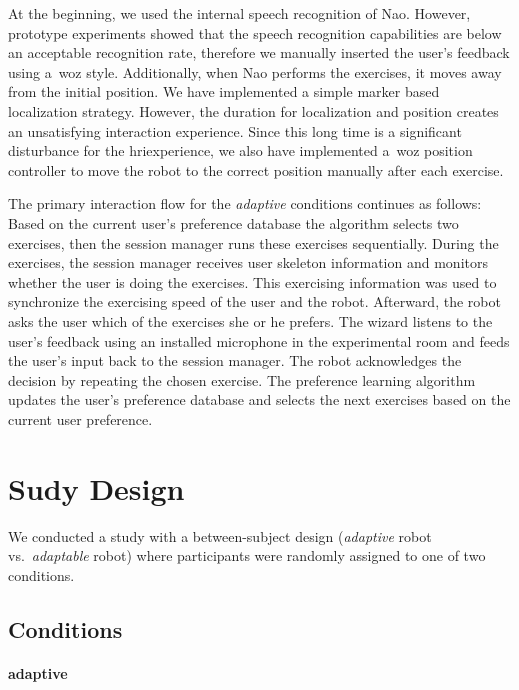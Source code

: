 \documentclass[twocolumn]{svjour3}          %
\begin{document}
At the beginning, we used the internal speech recognition of Nao.
However, prototype experiments showed that the speech recognition
capabilities are below an acceptable recognition rate, therefore we
manually inserted the user's feedback using a~\gls{woz} style.
Additionally, when Nao performs the exercises, it moves away from the
initial position. We have implemented a simple marker based localization
strategy. However, the duration for localization and position creates an unsatisfying interaction experience. Since this long time is a significant disturbance for
the \gls{hri}experience, we also have implemented a~\gls{woz} position controller
to move the robot to the correct position manually after each exercise.

The primary interaction flow for the \textit{adaptive} conditions continues as follows:
Based on the current user's preference database the algorithm selects
two exercises, then the session manager runs these exercises
sequentially. During the exercises, the session manager receives user
skeleton information and monitors whether the user is doing the
exercises. This exercising information was used to synchronize the
exercising speed of the user and the robot. Afterward, the robot asks
the user which of the exercises she or he prefers. The wizard listens to
the user's feedback using an installed microphone in the experimental
room and feeds the user's input back to the session manager. The robot
acknowledges the decision by repeating the chosen exercise. The
preference learning algorithm updates the user's preference database and
selects the next exercises based on the current user preference.

\hypertarget{sudy-design}{%
\section{\texorpdfstring{Sudy Design
\label{adaptation:sec:study}}{Sudy Design }}\label{sudy-design}}

We conducted a study with a between-subject design (\textit{adaptive} robot
vs.~\textit{adaptable} robot) where participants were randomly assigned to one of
two conditions.

\hypertarget{conditions}{%
\subsection{Conditions}\label{conditions}}

\hypertarget{adaptivity}{%
\paragraph{adaptive}\label{adaptivity}}
\end{document}
